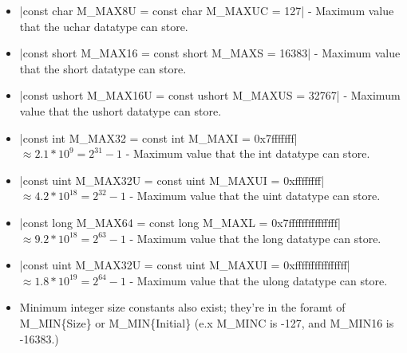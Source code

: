 \documentclass[12pt, letterpaper, oneside]{article}
\begin{document}
\begin{itemize}
		\item[--] \spverb|const char M_MAX8U = const char M_MAXUC = 127| - Maximum value that the uchar datatype can store.		
		\newline
		\item[--] \spverb|const short M_MAX16 = const short M_MAXS = 16383| - Maximum value that the short datatype can store.
		\item[--] \spverb|const ushort M_MAX16U = const ushort M_MAXUS = 32767| - Maximum value that the ushort datatype can store.
		\newline
		\item[--] \spverb|const int M_MAX32 = const int M_MAXI = 0x7fffffff| $\approx 2.1*10^9 = 2^{31}-1$ - Maximum value that the int datatype can store.
		\item[--] \spverb|const uint M_MAX32U = const uint M_MAXUI = 0xffffffff| $\approx 4.2*10^18 = 2^{32}-1$ - Maximum value that the uint datatype can store.
		\newline
		\item[--] \spverb|const long M_MAX64 = const long M_MAXL = 0x7fffffffffffffff| $\approx 9.2*10^18 = 2^{63}-1$ - Maximum value that the long datatype can store.
		\item[--] \spverb|const uint M_MAX32U = const uint M_MAXUI = 0xffffffffffffffff| $\approx 1.8*10^19 = 2^{64}-1$ - Maximum value that the ulong datatype can store.
		\item[--] Minimum integer size constants also exist; they're in the foramt of M\_MIN\{Size\} or M\_MIN\{Initial\} (e.x M\_MINC is -127, and M\_MIN16 is -16383.)
		
	\end{itemize} 
\end{document}
